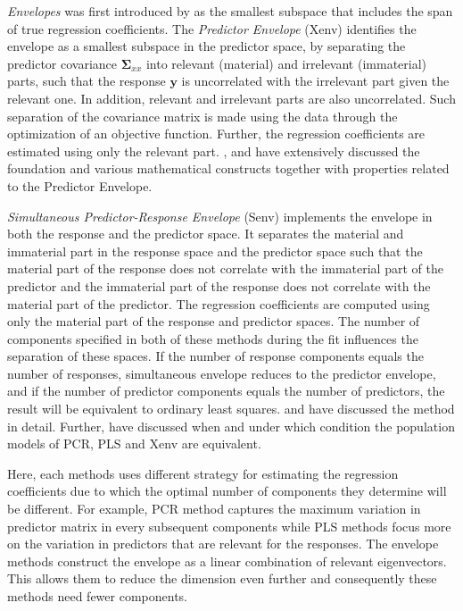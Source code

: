 \documentclass[12pt,3p,authoryear]{elsarticle}
\begin{document}
\emph{Envelopes} was first introduced by \citep{Cook2007a} as the smallest subspace that includes the span of true regression coefficients. The \emph{Predictor Envelope} (Xenv) identifies the envelope as a smallest subspace in the predictor space, by separating the predictor covariance \(\boldsymbol{\Sigma}_{xx}\) into relevant (material) and irrelevant (immaterial) parts, such that the response \(\mathbf{y}\) is uncorrelated with the irrelevant part given the relevant one. In addition, relevant and irrelevant parts are also uncorrelated. Such separation of the covariance matrix is made using the data through the optimization of an objective function. Further, the regression coefficients are estimated using only the relevant part. \citet{cook2010envelope}, \citet{cook2013envelopes} and \citet{cook2018envelope} have extensively discussed the foundation and various mathematical constructs together with properties related to the Predictor Envelope.

\emph{Simultaneous Predictor-Response Envelope} (Senv) implements the envelope in both the response and the predictor space. It separates the material and immaterial part in the response space and the predictor space such that the material part of the response does not correlate with the immaterial part of the predictor and the immaterial part of the response does not correlate with the material part of the predictor. The regression coefficients are computed using only the material part of the response and predictor spaces. The number of components specified in both of these methods during the fit influences the separation of these spaces. If the number of response components equals the number of responses, simultaneous envelope reduces to the predictor envelope, and if the number of predictor components equals the number of predictors, the result will be equivalent to ordinary least squares. \citet{cook2015simultaneous} and \citet{cook2018envelope} have discussed the method in detail. Further, \citet{helland2016algorithms} have discussed when and under which condition the population models of PCR, PLS and Xenv are equivalent.

Here, each methods uses different strategy for estimating the regression coefficients due to which the optimal number of components they determine will be different. For example, PCR method captures the maximum variation in predictor matrix in every subsequent components while PLS methods focus more on the variation in predictors that are relevant for the responses. The envelope methods construct the envelope as a linear combination of relevant eigenvectors. This allows them to reduce the dimension even further and consequently these methods need fewer components.
\end{document}
